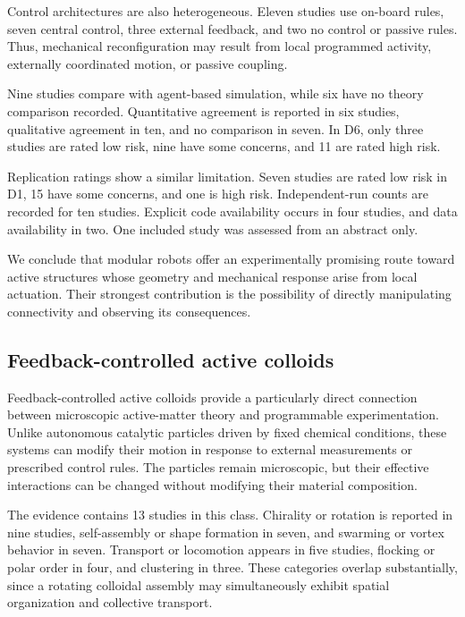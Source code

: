 Control architectures are
also heterogeneous.
Eleven studies use on-board
rules, seven central control,
three external feedback,
and two no control or
passive rules. Thus,
mechanical reconfiguration
may result from local
programmed activity,
externally coordinated
motion, or passive coupling.

Nine studies compare with
agent-based simulation,
while six have no theory
comparison recorded.
Quantitative agreement
is reported in six studies,
qualitative agreement in
ten, and no comparison
in seven. In D6, only
three studies are rated
low risk, nine have
some concerns, and
11 are rated high risk.

Replication ratings
show a similar limitation.
Seven studies are rated
low risk in D1,
15 have some concerns,
and one is high risk.
Independent-run counts
are recorded for ten
studies. Explicit code
availability occurs in
four studies, and data
availability in two.
One included study was
assessed from an abstract
only.

We conclude that modular
robots offer an experimentally
promising route toward
active structures whose
geometry and mechanical
response arise from local
actuation. Their strongest
contribution is the possibility
of directly manipulating
connectivity and observing
its consequences.

\subsection{Feedback-controlled active colloids}
\label{sec:platforms-colloids}

Feedback-controlled active colloids provide a particularly direct
connection between microscopic active-matter theory and programmable
experimentation. Unlike autonomous catalytic particles driven by
fixed chemical conditions, these systems can modify their motion
in response to external measurements or prescribed control rules.
The particles remain microscopic, but their effective interactions
can be changed without modifying their material composition.

The evidence contains 13 studies in this class. Chirality or
rotation is reported in nine studies, self-assembly or shape
formation in seven, and swarming or vortex behavior in seven.
Transport or locomotion appears in five studies, flocking or
polar order in four, and clustering in three. These categories
overlap substantially, since a rotating colloidal assembly
may simultaneously exhibit spatial organization and
collective transport.

